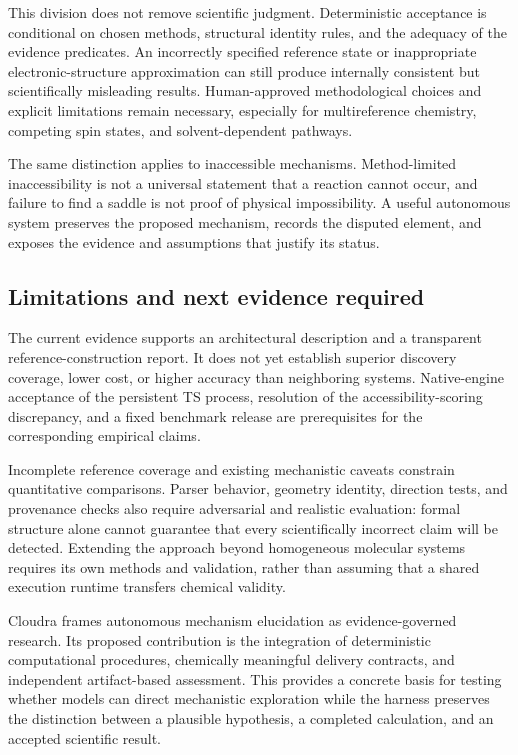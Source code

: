 \documentclass[11pt,a4paper]{article}
\begin{document}
This division does not remove scientific judgment. Deterministic acceptance is conditional on chosen methods, structural identity rules, and the adequacy of the evidence predicates. An incorrectly specified reference state or inappropriate electronic-structure approximation can still produce internally consistent but scientifically misleading results. Human-approved methodological choices and explicit limitations remain necessary, especially for multireference chemistry, competing spin states, and solvent-dependent pathways.

The same distinction applies to inaccessible mechanisms. Method-limited inaccessibility is not a universal statement that a reaction cannot occur, and failure to find a saddle is not proof of physical impossibility. A useful autonomous system preserves the proposed mechanism, records the disputed element, and exposes the evidence and assumptions that justify its status.

\subsection{Limitations and next evidence required}
The current evidence supports an architectural description and a transparent reference-construction report. It does not yet establish superior discovery coverage, lower cost, or higher accuracy than neighboring systems. Native-engine acceptance of the persistent TS process, resolution of the accessibility-scoring discrepancy, and a fixed benchmark release are prerequisites for the corresponding empirical claims.

Incomplete reference coverage and existing mechanistic caveats constrain quantitative comparisons. Parser behavior, geometry identity, direction tests, and provenance checks also require adversarial and realistic evaluation: formal structure alone cannot guarantee that every scientifically incorrect claim will be detected. Extending the approach beyond homogeneous molecular systems requires its own methods and validation, rather than assuming that a shared execution runtime transfers chemical validity.

Cloudra frames autonomous mechanism elucidation as evidence-governed research. Its proposed contribution is the integration of deterministic computational procedures, chemically meaningful delivery contracts, and independent artifact-based assessment. This provides a concrete basis for testing whether models can direct mechanistic exploration while the harness preserves the distinction between a plausible hypothesis, a completed calculation, and an accepted scientific result.
\end{document}
